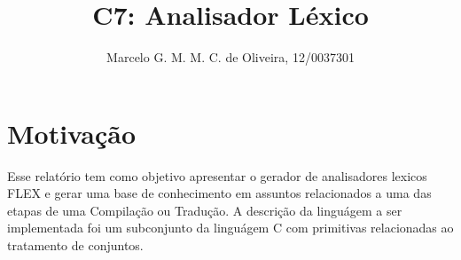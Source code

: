 \documentclass[runningheads]{llncs}
\begin{document}
%
\title{C7: Analisador Léxico}

\author{Marcelo G. M. M. C. de Oliveira, 12/0037301}
%
%
%

\maketitle              %
%

%
%
%
\section{Motivação}
Esse relatório tem como objetivo apresentar o gerador de analisadores lexicos FLEX e gerar uma base de conhecimento em assuntos relacionados a uma das etapas de uma Compilação ou Tradução. A descrição da linguágem a ser implementada foi um subconjunto da linguágem C com primitivas relacionadas ao tratamento de conjuntos.
\end{document}
